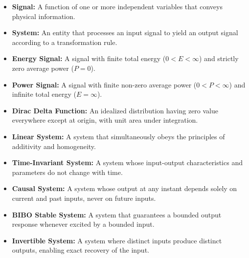\documentclass[12pt,a4paper]{article}
\begin{document}
\begin{tcolorbox}[defbox, title={\textbf{One-Line Definitions}}]
\begin{itemize}[leftmargin=*, itemsep=2pt, topsep=0pt]
  \item \textbf{Signal:} A function of one or more independent variables that conveys physical information.
  \item \textbf{System:} An entity that processes an input signal to yield an output signal according to a transformation rule.
  \item \textbf{Energy Signal:} A signal with finite total energy ($0 < E < \infty$) and strictly zero average power ($P=0$).
  \item \textbf{Power Signal:} A signal with finite non-zero average power ($0 < P < \infty$) and infinite total energy ($E=\infty$).
  \item \textbf{Dirac Delta Function:} An idealized distribution having zero value everywhere except at origin, with unit area under integration.
  \item \textbf{Linear System:} A system that simultaneously obeys the principles of additivity and homogeneity.
  \item \textbf{Time-Invariant System:} A system whose input-output characteristics and parameters do not change with time.
  \item \textbf{Causal System:} A system whose output at any instant depends solely on current and past inputs, never on future inputs.
  \item \textbf{BIBO Stable System:} A system that guarantees a bounded output response whenever excited by a bounded input.
  \item \textbf{Invertible System:} A system where distinct inputs produce distinct outputs, enabling exact recovery of the input.
\end{itemize}
\end{tcolorbox}
\end{document}
